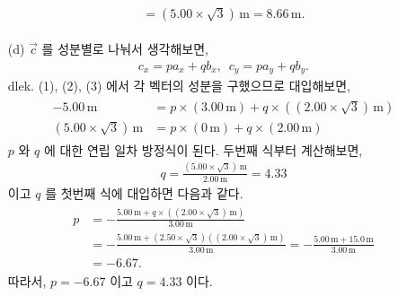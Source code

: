 \documentclass[floatfix,nofootinbib,superscriptaddress,fleqn,preprint]{revtex4}
\begin{document}
\begin{itemize}
\begin{align}
\begin{split}
      =(5.00\times\sqrt{3})\,\mathrm{m}
      =8.66\,\mathrm{m}.
    \end{split}
  \end{align}
  \item[(d)] $\vec{c}$ 를 성분별로 나눠서 생각해보면,
  \begin{align}
    c_x = p a_x + q b_x,\,\,\, c_y = p a_y + q b_y.
  \end{align}
dlek. (1), (2), (3) 에서 각 벡터의 성분을 구했으므로 대입해보면,
\begin{align}
  \begin{split}
    -5.00\,\mathrm{m} &= p\times(3.00\,\mathrm{m})
    +q\times((2.00\times\sqrt{3})\,\mathrm{m})  \\
    (5.00\times\sqrt{3})\,\mathrm{m} &= p\times(0\,\mathrm{m})
    +q\times(2.00\,\mathrm{m})
  \end{split}
\end{align}
$p$ 와 $q$ 에 대한 연립 일차 방정식이 된다. 두번째 식부터 계산해보면,
\begin{align}
  q = \frac{(5.00\times\sqrt{3})\,\mathrm{m}}{2.00\,\mathrm{m}}
    = 4.33
\end{align}
이고 $q$ 를 첫번째 식에 대입하면 다음과 같다.
\begin{align}
  \begin{split}
    p &=- \frac{5.00\,\mathrm{m}
    +q\times((2.00\times\sqrt{3})\,\mathrm{m})}{3.00\,\mathrm{m}} \\
    &=- \frac{5.00\,\mathrm{m}
    +(2.50\times\sqrt{3})((2.00\times\sqrt{3})\,\mathrm{m})}{3.00\,\mathrm{m}}
    =- \frac{5.00\,\mathrm{m}+15.0\,\mathrm{m}}{3.00\,\mathrm{m}} \\
    &= -6.67.
  \end{split}
\end{align}
따라서, $p = -6.67$ 이고 $q = 4.33$ 이다.
\end{itemize}
\end{document}
